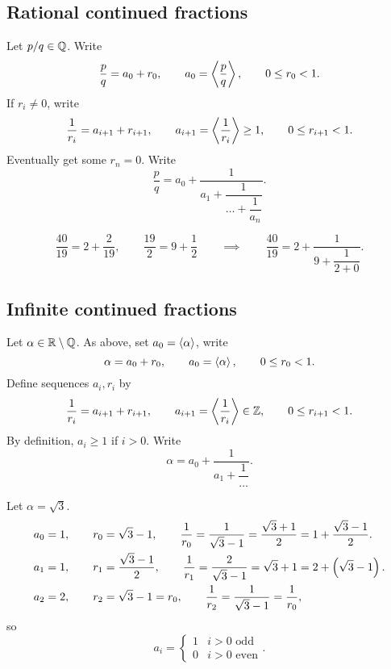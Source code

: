\subsection{Rational continued fractions}

Let $ p / q \in \mathbb{Q} $. Write
$$ \dfrac{p}{q} = a_0 + r_0, \qquad a_0 = \left\langle \dfrac{p}{q} \right\rangle, \qquad 0 \le r_0 < 1. $$
If $ r_i \ne 0 $, write
$$ \dfrac{1}{r_i} = a_{i + 1} + r_{i + 1}, \qquad a_{i + 1} = \left\langle \dfrac{1}{r_i} \right\rangle \ge 1, \qquad 0 \le r_{i + 1} < 1. $$
Eventually get some $ r_n = 0 $. Write
$$ \dfrac{p}{q} = a_0 + \dfrac{1}{a_1 + \dfrac{1}{\dots + \dfrac{1}{a_n}}}. $$

\begin{example2}
$$ \dfrac{40}{19} = 2 + \dfrac{2}{19}, \qquad \dfrac{19}{2} = 9 + \dfrac{1}{2} \qquad \implies \qquad \dfrac{40}{19} = 2 + \dfrac{1}{9 + \dfrac{1}{2 + 0}}. $$
\end{example2}

\subsection{Infinite continued fractions}

Let $ \alpha \in \mathbb{R} \setminus \mathbb{Q} $. As above, set $ a_0 = \left\langle \alpha \right\rangle $, write
$$ \alpha = a_0 + r_0, \qquad a_0 = \left\langle \alpha \right\rangle, \qquad 0 \le r_0 < 1. $$
Define sequences $ a_i, r_i $ by
$$ \dfrac{1}{r_i} = a_{i + 1} + r_{i + 1}, \qquad a_{i + 1} = \left\langle \dfrac{1}{r_i} \right\rangle \in \mathbb{Z}, \qquad 0 \le r_{i + 1} < 1. $$
By definition, $ a_i \ge 1 $ if $ i > 0 $. Write
$$ \alpha = a_0 + \dfrac{1}{a_1 + \dfrac{1}{\dots}}. $$

\begin{example2}
Let $ \alpha = \sqrt{3} $.
\begin{align*}
& a_0 = 1, \qquad r_0 = \sqrt{3} - 1, \qquad \dfrac{1}{r_0} = \dfrac{1}{\sqrt{3} - 1} = \dfrac{\sqrt{3} + 1}{2} = 1 + \dfrac{\sqrt{3} - 1}{2}. \\
& a_1 = 1, \qquad r_1 = \dfrac{\sqrt{3} - 1}{2}, \qquad \dfrac{1}{r_1} = \dfrac{2}{\sqrt{3} - 1} = \sqrt{3} + 1 = 2 + \left( \sqrt{3} - 1 \right). \\
& a_2 = 2, \qquad r_2 = \sqrt{3} - 1 = r_0, \qquad \dfrac{1}{r_2} = \dfrac{1}{\sqrt{3} - 1} = \dfrac{1}{r_0},
\end{align*}
so
$$ a_i = \begin{cases}
1 & i > 0 \text{ odd} \\
0 & i > 0 \text{ even}
\end{cases}. $$
\end{example2}

